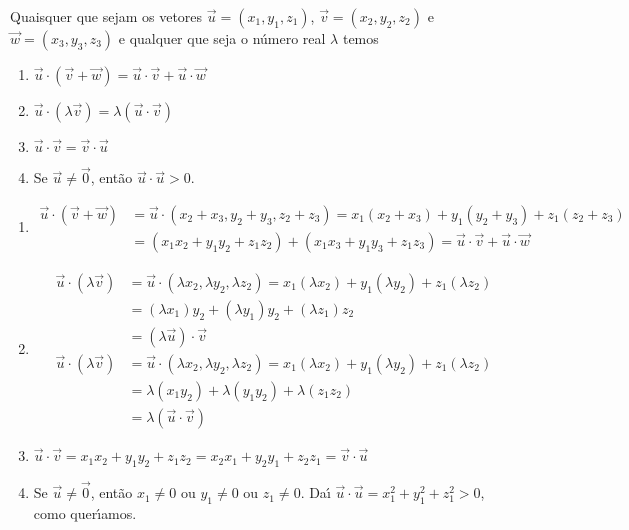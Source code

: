 \begin{proposicao}\label{propriedades-produto-vetorial-espaco}
  Quaisquer que sejam os vetores $\vec{u} = (x_1, y_1,z_1)$, $\vec{v} = (x_2, y_2,z_2)$ e $\vec{w} = (x_3, y_3,z_3)$ e qualquer que seja o n\'umero real $\lambda$ temos
  \begin{enumerate}[label=({\roman*})]
    \item\label{linearidade-soma-produto-vetorial-espaco} $\vec{u}\cdot(\vec{v} + \vec{w}) = \vec{u}\cdot\vec{v} + \vec{u}\cdot\vec{w}$
    \item\label{linearidade-escalar-produto-vetorial-espaco} $\vec{u}\cdot(\lambda\vec{v}) = \lambda(\vec{u}\cdot\vec{v})$
    \item $\vec{u}\cdot\vec{v} = \vec{v}\cdot\vec{u}$
    \item Se $\vec{u} \ne \vec{0}$, ent\~ao $\vec{u}\cdot\vec{u} > 0$.
  \end{enumerate}
\end{proposicao}
\begin{prova}
  \begin{enumerate}[label=({\roman*})]
    \item \begin{align*}
      \vec{u}\cdot(\vec{v} + \vec{w}) &= \vec{u}\cdot(x_2 + x_3, y_2 + y_3, z_2 + z_3) = x_1(x_2 + x_3) + y_1(y_2 + y_3) + z_1(z_2+z_3) \\ &= (x_1x_2 + y_1y_2 + z_1z_2) + (x_1x_3 + y_1y_3 + z_1z_3) = \vec{u}\cdot\vec{v} + \vec{u}\cdot\vec{w}
    \end{align*}
    \item \begin{align*}
      \vec{u}\cdot(\lambda\vec{v}) &= \vec{u}\cdot(\lambda x_2, \lambda y_2, \lambda z_2) = x_1(\lambda x_2) + y_1(\lambda y_2) + z_1(\lambda z_2)\\ &= (\lambda x_1)y_2 + (\lambda y_1)y_2 + (\lambda z_1)z_2 \\ &= (\lambda\vec{u})\cdot\vec{v}\\
      \vec{u}\cdot(\lambda\vec{v}) &= \vec{u}\cdot(\lambda x_2, \lambda y_2, \lambda z_2) = x_1(\lambda x_2) + y_1(\lambda y_2) + z_1(\lambda z_2)\\ &= \lambda (x_1y_2) + \lambda (y_1y_2) + \lambda(z_1z_2) \\ &= \lambda(\vec{u}\cdot\vec{v})
    \end{align*}
    \item $\vec{u}\cdot\vec{v} = x_1x_2 + y_1y_2 + z_1z_2 = x_2x_1 + y_2y_1 + z_2z_1 = \vec{v}\cdot\vec{u}$
    \item Se $\vec{u} \ne \vec{0}$, ent\~ao $x_1 \ne 0$ ou $y_1 \ne 0$ ou $z_1 \ne 0$. Da{\'\i} $\vec{u}\cdot\vec{u} = x_1^2 + y_1^2 + z_1^2> 0$, como quer{\'\i}amos.
  \end{enumerate}
\end{prova}

